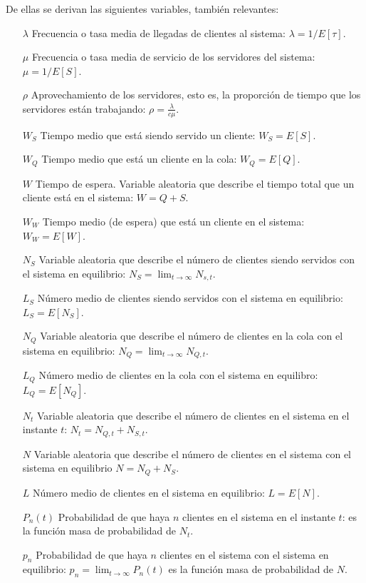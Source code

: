 \documentclass[a4paper,10pt]{scrartcl}
\theoremstyle{definition}
\numberwithin{equation}{section}
\begin{document}
	De ellas se derivan las siguientes variables, también relevantes:
	\begin{itemize}
		\item [$\lambda$]
		Frecuencia o tasa media de llegadas de clientes al sistema: $\lambda = 1/E[\tau]$.
		\item [$\mu$]
		Frecuencia o tasa media de servicio de los servidores del sistema: $\mu = 1/E[S]$.
		\item [$\rho$]
		Aprovechamiento de los servidores, esto es, la proporción de tiempo que los servidores están trabajando: $\rho = \frac{\lambda}{c\mu}$.
		\item [$W_S$]
		Tiempo medio que está siendo servido un cliente: $W_S  = E[S]$.
		\item [$W_Q$]
		Tiempo medio que está un cliente en la cola: $W_Q = E[Q]$.
		\item [$W$]
		Tiempo de espera. Variable aleatoria que describe el tiempo total que un cliente está en el sistema: $W = Q+S$.
		\item [$W_W$]
		Tiempo medio (de espera) que está un cliente en el sistema: $W_W = E[W]$.
		\item [$N_S$]
		Variable aleatoria que describe el número de clientes siendo servidos con el sistema en equilibrio: $N_S = \lim_{t \rightarrow \infty} N_{s,t}$.
		\item [$L_S$]
		Número medio de clientes siendo servidos con el sistema en equilibrio: \\ $L_S = E[N_S]$.
		\item [$N_Q$]
		Variable aleatoria que describe el número de clientes en la cola con el sistema en equilibrio: $N_Q = \lim_{t \rightarrow \infty} N_{Q,t}$.
		\item [$L_Q$]
		Número medio de clientes en la cola con el sistema en equilibro: $L_Q = E[N_Q]$.
		\item [$N_t$]
		Variable aleatoria que describe el número de clientes en el sistema en el instante $t$: $N_t = N_{Q,t} + N_{S,t}$.
		\item [$N$]
		Variable aleatoria que describe el número de clientes en el sistema con el sistema en equilibrio $N = N_Q + N_S$.
		\item [$L$]
		Número medio de clientes en el sistema en equilibrio: $L = E[N]$.
		\item [$P_n(t)$]
		Probabilidad de que haya $n$ clientes en el sistema en el instante $t$: es la función masa de probabilidad de $N_t$.
		\item [$p_n$]
		Probabilidad de que haya $n$ clientes en el sistema con el sistema en equilibrio: $p_n = \lim_{t \rightarrow \infty} P_n(t)$ es la función masa de probabilidad de $N$.
	\end{itemize}
	
\end{document}
